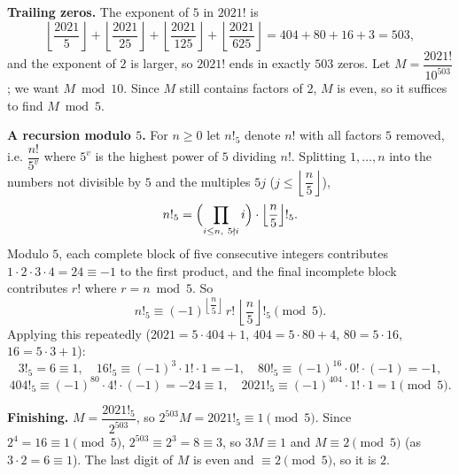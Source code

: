 \textbf{Trailing zeros.} The exponent of $5$ in $2021!$ is
\[\left\lfloor\dfrac{2021}{5}\right\rfloor+\left\lfloor\dfrac{2021}{25}\right\rfloor+\left\lfloor\dfrac{2021}{125}\right\rfloor+\left\lfloor\dfrac{2021}{625}\right\rfloor=404+80+16+3=503,\]
and the exponent of $2$ is larger, so $2021!$ ends in exactly $503$ zeros. Let $M=\dfrac{2021!}{10^{503}}$; we want $M\bmod 10$. Since $M$ still contains factors of $2$, $M$ is even, so it suffices to find $M\bmod5$.

\textbf{A recursion modulo $5$.} For $n\ge0$ let $n!_5$ denote $n!$ with all factors $5$ removed, i.e. $\dfrac{n!}{5^{v}}$ where $5^v$ is the highest power of $5$ dividing $n!$. Splitting $1,\dots,n$ into the numbers not divisible by $5$ and the multiples $5j$ ($j\le\left\lfloor\dfrac n5\right\rfloor$),
\[n!_5=\Bigl(\prod_{i\le n,\ 5\nmid i}i\Bigr)\cdot\left\lfloor\dfrac n5\right\rfloor!_5.\]
Modulo $5$, each complete block of five consecutive integers contributes $1\cdot2\cdot3\cdot4=24\equiv-1$ to the first product, and the final incomplete block contributes $r!$ where $r=n\bmod5$. So
\[n!_5\equiv(-1)^{\left\lfloor\dfrac n5\right\rfloor}\,r!\,\left\lfloor\dfrac n5\right\rfloor!_5\pmod5.\]
Applying this repeatedly ($2021=5\cdot404+1$, $404=5\cdot80+4$, $80=5\cdot16$, $16=5\cdot3+1$):
\[3!_5=6\equiv1,\quad 16!_5\equiv(-1)^3\cdot1!\cdot1=-1,\quad 80!_5\equiv(-1)^{16}\cdot0!\cdot(-1)=-1,\]
\[404!_5\equiv(-1)^{80}\cdot4!\cdot(-1)=-24\equiv1,\quad 2021!_5\equiv(-1)^{404}\cdot1!\cdot1=1\pmod5.\]

\textbf{Finishing.} $M=\dfrac{2021!_5}{2^{503}}$, so $2^{503}M=2021!_5\equiv1\pmod5$. Since $2^4=16\equiv1\pmod5$, $2^{503}\equiv2^3=8\equiv3$, so $3M\equiv1$ and $M\equiv2\pmod5$ (as $3\cdot2=6\equiv1$). The last digit of $M$ is even and $\equiv2\pmod5$, so it is $\boxed{2}$.
